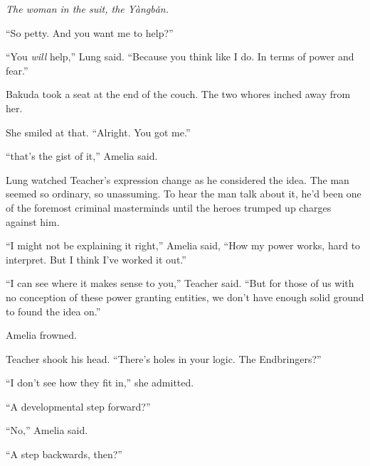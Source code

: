\emph{The woman in the suit, the Y\`{a}ngb\v{a}n.}



``So petty.  And you want me to help?''



``You \emph{will} help,'' Lung said.  ``Because you think like I do.  In terms of power and fear.''



Bakuda took a seat at the end of the couch.  The two whores inched away from her.



She smiled at that.  ``Alright.  You got me.''



\sectionbreak






``\ldotsand that's the gist of it,'' Amelia said.



Lung watched Teacher's expression change as he considered the idea.  The man seemed so ordinary, so unassuming.  To hear the man talk about it, he'd been one of the foremost criminal masterminds until the heroes trumped up charges against him.



``I might not be explaining it right,'' Amelia said, ``How my power works, hard to interpret.  But I think I've worked it out.''



``I can see where it makes sense to you,'' Teacher said.  ``But for those of us with no conception of these power granting entities, we don't have enough solid ground to found the idea on.''



Amelia frowned.



Teacher shook his head.  ``There's holes in your logic.  The Endbringers?''



``I don't see how they fit in,'' she admitted.



``A developmental step forward?''



``No,'' Amelia said.



``A step backwards, then?''



